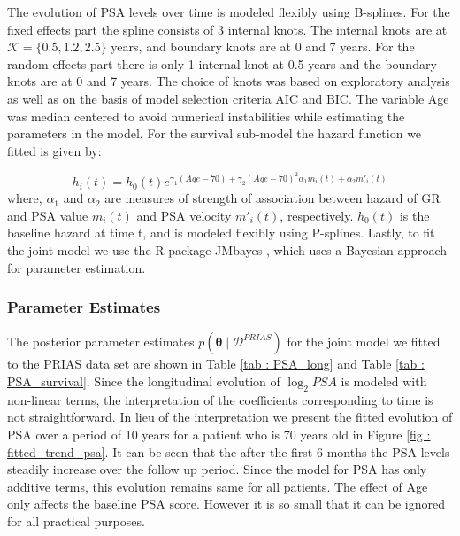 The evolution of PSA levels over time is modeled flexibly using B-splines. For the fixed effects part the spline consists of 3 internal knots. The internal knots are at $\mathcal{K} =\{0.5, 1.2, 2.5\}$ years, and boundary knots are at 0 and 7 years. For the random effects part there is only 1 internal knot at 0.5 years and the boundary knots are at 0 and 7 years. The choice of knots was based on exploratory analysis as well as on the basis of model selection criteria AIC and BIC. The variable Age was median centered to avoid numerical instabilities while estimating the parameters in the model. For the survival sub-model the hazard function we fitted is given by:

\begin{equation}
\label{eq : hazard_prias}
h_i(t) = h_0(t) e^{\gamma_1 (Age-70)  + \gamma_2 (Age-70)^2  \alpha_1 m_i(t) + \alpha_2 m'_i(t)}
\end{equation}
where, $\alpha_1$ and $\alpha_2$ are measures of strength of association between hazard of GR and PSA value $m_i(t)$ and PSA velocity $m'_i(t)$, respectively. $h_0(t)$ is the baseline hazard at time t, and is modeled flexibly using P-splines\citep{eilers1996flexible}. Lastly, to fit the joint model we use the R package JMbayes \cite{rizopoulosJMbayes}, which uses a Bayesian approach for parameter estimation.

\subsubsection{Parameter Estimates}
\label{subsec : param_estimates_jm_fit_prias}
The posterior parameter estimates $p(\boldsymbol{\theta} \mid \mathcal{D}^{PRIAS})$ for the joint model we fitted to the PRIAS data set are shown in Table \ref{tab : PSA_long} and Table \ref{tab : PSA_survival}. Since the longitudinal evolution of $\log_2 PSA$ is modeled with non-linear terms, the interpretation of the coefficients corresponding to time is not straightforward. In lieu of the interpretation we present the fitted evolution of PSA over a period of 10 years for a patient who is 70 years old in Figure \ref{fig : fitted_trend_psa}. It can be seen that the after the first 6 months the PSA levels steadily increase over the follow up period. Since the model for PSA has only additive terms, this evolution remains same for all patients. The effect of Age only affects the baseline PSA score. However it is so small that it can be ignored for all practical purposes.\\

